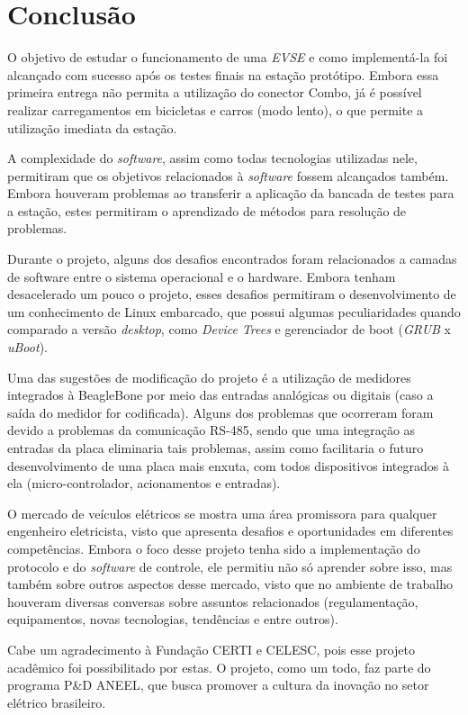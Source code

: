 \chapter{Conclusão}
\label{stateofart:conclusion}

  O objetivo de estudar o funcionamento de uma \textit{\ac{EVSE}} e como implementá-la foi alcançado com sucesso após os testes finais na estação protótipo. Embora essa primeira entrega não permita a utilização do conector Combo, já é possível realizar carregamentos em bicicletas e carros (modo lento), o que permite a utilização imediata da estação.

  A complexidade do \textit{software}, assim como todas tecnologias utilizadas nele, permitiram que os objetivos relacionados à \textit{software} fossem alcançados também. Embora houveram problemas ao transferir a aplicação da bancada de testes para a estação, estes permitiram o aprendizado de métodos para resolução de problemas.

  Durante o projeto, alguns dos desafios encontrados foram relacionados a camadas de software entre o sistema operacional e o hardware. Embora tenham desacelerado um pouco o projeto, esses desafios permitiram o desenvolvimento de um conhecimento de Linux embarcado, que possui algumas peculiaridades quando comparado a versão \textit{desktop}, como \textit{Device Trees} e gerenciador de boot (\textit{GRUB} x \textit{uBoot}).

  Uma das sugestões de modificação do projeto é a utilização de medidores integrados à BeagleBone por meio das entradas analógicas ou digitais (caso a saída do medidor for codificada). Alguns dos problemas que ocorreram foram devido a problemas da comunicação RS-485, sendo que uma integração as entradas da placa eliminaria tais problemas, assim como facilitaria o futuro desenvolvimento de uma placa mais enxuta, com todos dispositivos integrados à ela (micro-controlador, acionamentos e entradas).
  
  O mercado de veículos elétricos se mostra uma área promissora para qualquer engenheiro eletricista, visto que apresenta desafios e oportunidades em diferentes competências. Embora o foco desse projeto tenha sido a implementação do protocolo e do \textit{software} de controle, ele permitiu não só aprender sobre isso, mas também sobre outros aspectos desse mercado, visto que no ambiente de trabalho houveram diversas conversas sobre assuntos relacionados (regulamentação, equipamentos, novas tecnologias, tendências e entre outros).

  Cabe um agradecimento à Fundação CERTI e CELESC, pois esse projeto acadêmico foi possibilitado por estas. O projeto, como um todo, faz parte do programa P\&D ANEEL, que busca promover a cultura da inovação no setor elétrico brasileiro.
  